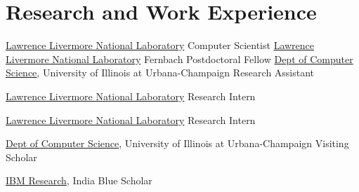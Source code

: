 \section{Research and Work Experience}
		{\href{http://www.llnl.gov}{Lawrence Livermore National Laboratory}}
		{Computer Scientist}
		{}{}
		{}
		{\href{http://www.llnl.gov}{Lawrence Livermore National Laboratory}}
		{Fernbach Postdoctoral Fellow}
		{}{}
		{}
		{\href{https://cs.illinois.edu}{Dept of Computer Science}, University of Illinois at Urbana-Champaign}
		{Research Assistant}
		{}{}
		{}

		{\href{http://www.llnl.gov}{Lawrence Livermore National Laboratory}}
		{Research Intern}
		{}{}
		{}

		{\href{http://www.llnl.gov}{Lawrence Livermore National Laboratory}}
		{Research Intern}
		{}{}
		{}

		{\href{https://cs.illinois.edu}{Dept of Computer Science}, University of Illinois at Urbana-Champaign}
		{Visiting Scholar}
		{}{}
		{}

		{\href{http://www.research.ibm.com/labs/india}{IBM Research}, India}
		{Blue Scholar}
		{}{}
		{}
